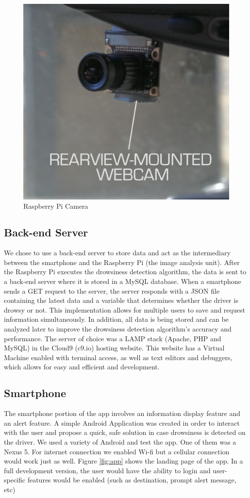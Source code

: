 \documentclass[twocolumn]{article}
\begin{document}
\begin{figure}[H]
\centering
\includegraphics[width=0.8\linewidth]{./camera.png}
\caption{Raspberry Pi Camera }
\label{fig:camera}
\end{figure}

\subsection{Back-end Server}
We chose to use a back-end server to store data and act as the intermediary between the smartphone and the Raspberry Pi (the image analysis unit). After the Raspberry Pi executes the drowsiness detection algorithm, the data is sent to a back-end server where it is stored in a MySQL database. When a smartphone sends a GET request to the server, the server responds with a JSON file containing the latest data and a variable that determines whether the driver is drowsy or not. This implementation allows for multiple users to save and request information simultaneously. In addition, all data is being stored and can be analyzed later to improve the drowsiness detection algorithm's accuracy and performance. The server of choice was a LAMP stack (Apache, PHP and MySQL) in the Cloud9 (c9.io) hosting website. This website has a Virtual Machine enabled with terminal access, as well as text editors and debuggers, which allows for easy and efficient and development. 

\subsection{Smartphone}
The smartphone portion of the app involves an information display feature and an alert feature. A simple Android Application was created in order to interact with the user and propose a quick, safe solution in case drowsiness is detected on the driver. We used a variety of Android and test the app. One of them was a Nexus 5. For internet connection we enabled Wi-fi but a cellular connection would work just as well. Figure \ref{fig:app} shows the landing page of the app. In a full development version, the user would have the ability to login and user-specific features would be enabled (such as destination, prompt alert message, etc)
\end{document}
